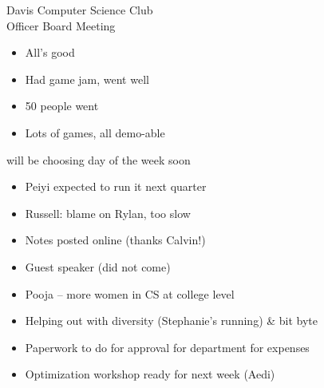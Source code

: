 \documentclass{article}
\begin{document}
\begin{Minutes}{Davis Computer Science Club\\Officer Board Meeting}
\begin{itemize}
\item All's good
\end {itemize}

\begin {itemize}
\item Had game jam, went well
\item 50 people went
\item Lots of games, all demo-able
\end {itemize}

will be choosing day of the week soon

\begin {itemize}
\item Peiyi expected to run it next quarter
\item Russell: blame on Rylan, too slow
\item Notes posted online (thanks Calvin!)
\end {itemize}

\begin {itemize}
\item Guest speaker (did not come)
\item Pooja -- more women in CS at college level
\item Helping out with diversity (Stephanie’s running) & bit byte
\item Paperwork to do for approval for department for expenses
\item Optimization workshop ready for next week (Aedi)
\end {itemize}

\end{Minutes}
\thispagestyle{creditfooter}
\end{document}
